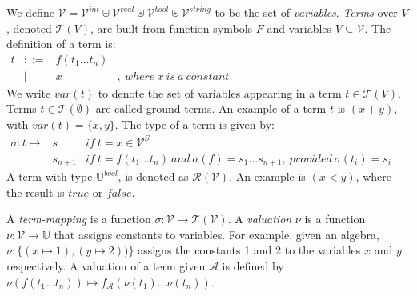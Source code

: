 We define $\mathcal{V} = \mathcal{V}^{int} \uplus \mathcal{V}^{real} \uplus \mathcal{V}^{bool} \uplus \mathcal{V}^{string}$ to be the set of \textit{variables}. \textit{Terms} over $V$, denoted $\mathcal{T}(V)$, are built from function symbols $F$ and variables $V \subseteq \mathcal{V}$. The definition of a term is:
\vspace{8px}\\
$\begin{array}{lrlr}t & ::= & f(t_1 ... t_n) &\\ & | & x&\mathit{,\: where\: x\: is\: a\: constant.}\end{array}$
\vspace{8px}\\
We write $var(t)$ to denote the set of variables appearing in a term $t \in \mathcal{T}(V)$. Terms $t\in \mathcal{T}(\emptyset)$ are called ground terms. An example of a term $\mathit{t}$ is $(x+y)$, with $var(t) = \{x,y\}$. The type of a term is given by:
\vspace{8px}\\
$\begin{array}{lll}\sigma: t \mapsto & s       & \mathit{if}\: t = x \in \mathcal{V}^S \\ 
                                     & s_{n+1} & \mathit{if}\: t = f(t_1 ... t_n) \mathit{\:and\:} \sigma(f) = s_1 ... s_{n+1}\mathit{,\:provided\:} \sigma(t_i) = s_i
\end{array}$
\vspace{8px}\\
A term with type $\mathbb{U}^{bool}$, is denoted as $\mathcal{R}(\mathcal{V})$. An example is $(x < y)$, where the result is $\mathit{true}$ or $\mathit{false}$.

A \textit{term-mapping} is a function $\sigma:\mathcal{V} \rightarrow \mathcal{T}(\mathcal{V})$. A \textit{valuation} $\nu$ is a function $\nu:\mathcal{V} \rightarrow \mathbb{U}$ that assigns constants to variables. For example, given an algebra, $\nu:\{(x \mapsto 1), (y \mapsto 2))\}$ assigns the constants 1 and 2 to the variables $x$ and $y$ respectively.
A valuation of a term given $\mathcal{A}$ is defined by $\nu(f(t_1 ... t_n)) \mapsto f_\mathcal{A}(\nu(t_1) ... \nu(t_n))$.

